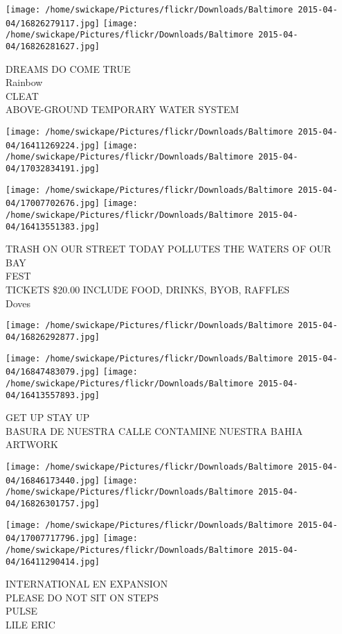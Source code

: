 \documentclass[10pt,letterpaper]{article}
\begin{document}
\texttt{[image: /home/swickape/Pictures/flickr/Downloads/Baltimore 2015-04-04/16826279117.jpg]}
\texttt{[image: /home/swickape/Pictures/flickr/Downloads/Baltimore 2015-04-04/16826281627.jpg]}

DREAMS DO COME TRUE\\
Rainbow\\
CLEAT\\
ABOVE{-}GROUND TEMPORARY WATER SYSTEM
\pagebreak

\texttt{[image: /home/swickape/Pictures/flickr/Downloads/Baltimore 2015-04-04/16411269224.jpg]}
\texttt{[image: /home/swickape/Pictures/flickr/Downloads/Baltimore 2015-04-04/17032834191.jpg]}

\texttt{[image: /home/swickape/Pictures/flickr/Downloads/Baltimore 2015-04-04/17007702676.jpg]}
\texttt{[image: /home/swickape/Pictures/flickr/Downloads/Baltimore 2015-04-04/16413551383.jpg]}

TRASH ON OUR STREET TODAY POLLUTES THE WATERS OF OUR BAY\\
FEST\\
TICKETS \$20.00 INCLUDE FOOD, DRINKS, BYOB, RAFFLES\\
Doves
\pagebreak

\texttt{[image: /home/swickape/Pictures/flickr/Downloads/Baltimore 2015-04-04/16826292877.jpg]}

\vspace{0.25in}
\texttt{[image: /home/swickape/Pictures/flickr/Downloads/Baltimore 2015-04-04/16847483079.jpg]}
\texttt{[image: /home/swickape/Pictures/flickr/Downloads/Baltimore 2015-04-04/16413557893.jpg]}

GET UP STAY UP\\
BASURA DE NUESTRA CALLE CONTAMINE NUESTRA BAHIA\\
ARTWORK
\pagebreak

\texttt{[image: /home/swickape/Pictures/flickr/Downloads/Baltimore 2015-04-04/16846173440.jpg]}
\texttt{[image: /home/swickape/Pictures/flickr/Downloads/Baltimore 2015-04-04/16826301757.jpg]}

\texttt{[image: /home/swickape/Pictures/flickr/Downloads/Baltimore 2015-04-04/17007717796.jpg]}
\texttt{[image: /home/swickape/Pictures/flickr/Downloads/Baltimore 2015-04-04/16411290414.jpg]}

INTERNATIONAL EN EXPANSION\\
PLEASE DO NOT SIT ON STEPS\\
PULSE\\
LILE ERIC
\pagebreak
\end{document}
